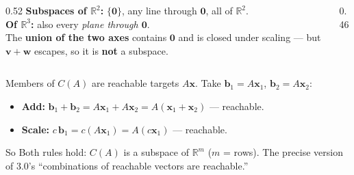 \documentclass[aspectratio=169, 11pt]{beamer}
\newcommand{\vv}{\mathbf{v}}
\newcommand{\ww}{\mathbf{w}}
\newcommand{\xx}{\mathbf{x}}
\newcommand{\bb}{\mathbf{b}}
\newcommand{\zero}{\mathbf{0}}
\begin{document}
\begin{frame}[t, plain]
  \begin{columns}[T]
    \begin{column}{0.52\textwidth}
      \textbf{Subspaces of $\mathbb{R}^2$:} $\{\zero\}$, any line through $\zero$, all of $\mathbb{R}^2$.\\[4pt]
      \textbf{Of $\mathbb{R}^3$:} also every \emph{plane through $\zero$}.\\[10pt]
      The \textbf{union of the two axes} contains $\zero$ and is closed under scaling --- but
      $\vv+\ww$ escapes, so it is \textbf{not} a subspace.
    \end{column}
    \begin{column}{0.46\textwidth}
      \centering
    \end{column}
  \end{columns}
\end{frame}

\begin{frame}[t, plain]
  Members of $C(A)$ are reachable targets $A\xx$. Take $\bb_1=A\xx_1$, $\bb_2=A\xx_2$:
  \begin{itemize}
    \setlength{\itemsep}{6pt}
    \item \textbf{Add:} $\bb_1+\bb_2=A\xx_1+A\xx_2=A(\xx_1+\xx_2)$ --- reachable.
    \item \textbf{Scale:} $c\,\bb_1=c(A\xx_1)=A(c\xx_1)$ --- reachable.
  \end{itemize}
  \vspace{4pt}
  \begin{block}{So}
    Both rules hold: $C(A)$ is a subspace of $\mathbb{R}^m$ ($m$ = rows). The precise version of
    3.0's ``combinations of reachable vectors are reachable.''
  \end{block}
\end{frame}
\end{document}
